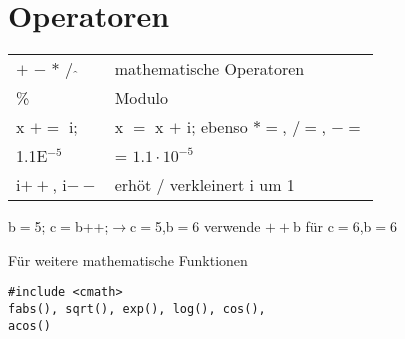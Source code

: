 \section{Operatoren}

\begin{center}
	\begin{tabular}{ ll } 
		$+$ $-$ $\ast$ $/$ $\hat{}$ & mathematische Operatoren\\
		 \% & Modulo\\
		x $+=$ i; & x $=$ x $+$ i; ebenso $*=$, $/=$, $-=$\\
		1.1E$^{-5}$ & = $1.1\cdot10^{-5}$\\
		i$++$, i$--$ & erhöt / verkleinert i um 1
	\end{tabular}
\end{center}
b$=$5; c$=$b++;$\rightarrow$c$=$5,b$=$6 verwende $++$b für c$=$6,b$=$6

Für weitere mathematische Funktionen
\begin{lstlisting}
#include <cmath>
fabs(), sqrt(), exp(), log(), cos(),
acos()
\end{lstlisting}
















